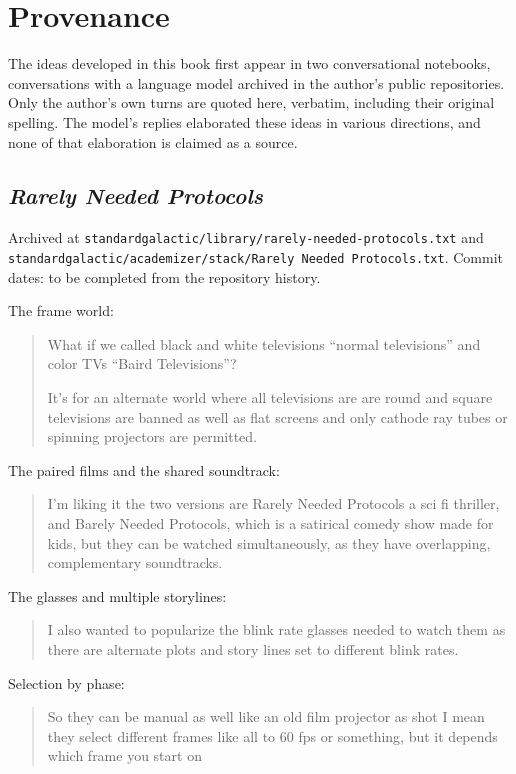 \chapter{Provenance}\label{app:provenance}

The ideas developed in this book first appear in two conversational notebooks, conversations with a language model archived in the author's public repositories. Only the author's own turns are quoted here, verbatim, including their original spelling. The model's replies elaborated these ideas in various directions, and none of that elaboration is claimed as a source.

\section*{\emph{Rarely Needed Protocols}}

{\raggedright Archived at \texttt{standardgalactic/\allowbreak{}library/\allowbreak{}rarely-needed-protocols.txt} and \texttt{standardgalactic/\allowbreak{}academizer/\allowbreak{}stack/\allowbreak{}Rarely Needed Protocols.txt}. Commit dates: to be completed from the repository history.\par}

The frame world:
\begin{quote}
What if we called black and white televisions ``normal televisions'' and color TVs ``Baird Televisions''?

It's for an alternate world where all televisions are are round and square televisions are banned as well as flat screens and only cathode ray tubes or spinning projectors are permitted.
\end{quote}

The paired films and the shared soundtrack:
\begin{quote}
I'm liking it the two versions are Rarely Needed Protocols a sci fi thriller, and Barely Needed Protocols, which is a satirical comedy show made for kids, but they can be watched simultaneously, as they have overlapping, complementary soundtracks.
\end{quote}

The glasses and multiple storylines:
\begin{quote}
I also wanted to popularize the blink rate glasses needed to watch them as there are alternate plots and story lines set to different blink rates.
\end{quote}

Selection by phase:
\begin{quote}
So they can be manual as well like an old film projector as shot I mean they select different frames like all to 60 fps or something, but it depends which frame you start on
\end{quote}

